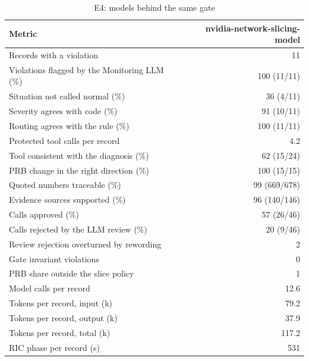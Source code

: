 \begin{table}[!t]
\centering
\caption{E4: models behind the same gate}\label{tab:models}
\footnotesize
\setlength{\tabcolsep}{3pt}
\begin{tabular}{@{}lr@{}}
\toprule
Metric & nvidia-network-slicing-model \\
\midrule
Records with a violation & 11 \\
Violations flagged by the Monitoring LLM (\%) & 100 (11/11) \\
Situation not called normal (\%) & 36 (4/11) \\
Severity agrees with code (\%) & 91 (10/11) \\
Routing agrees with the rule (\%) & 100 (11/11) \\
Protected tool calls per record & 4.2 \\
Tool consistent with the diagnosis (\%) & 62 (15/24) \\
PRB change in the right direction (\%) & 100 (15/15) \\
Quoted numbers traceable (\%) & 99 (669/678) \\
Evidence sources supported (\%) & 96 (140/146) \\
Calls approved (\%) & 57 (26/46) \\
Calls rejected by the LLM review (\%) & 20 (9/46) \\
Review rejection overturned by rewording & 2 \\
Gate invariant violations & 0 \\
PRB share outside the slice policy & 1 \\
Model calls per record & 12.6 \\
Tokens per record, input (k) & 79.2 \\
Tokens per record, output (k) & 37.9 \\
Tokens per record, total (k) & 117.2 \\
RIC phase per record (s) & 531 \\
\bottomrule
\end{tabular}
\end{table}
